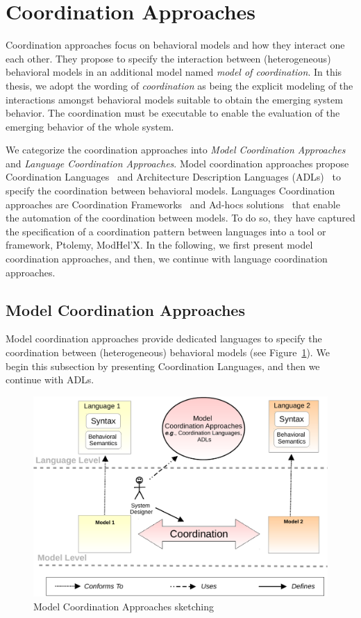 \section{Coordination Approaches}
Coordination approaches focus on behavioral models and how they interact one each other. They propose to specify the interaction between (heterogeneous) behavioral models in an additional model named \emph{model of coordination}. In this thesis, we adopt the wording of \emph{coordination} as being the explicit modeling of the interactions amongst behavioral models suitable to obtain the emerging system behavior. The coordination must be executable to enable the evaluation of the emerging behavior of the whole system. 

We categorize the coordination approaches into \emph{Model Coordination Approaches} and \emph{Language Coordination Approaches}. Model coordination approaches propose Coordination Languages~\cite{coordsignibib} and Architecture Description Languages (ADLs)~\cite{frameadlsbib} to specify the coordination between behavioral models. Languages Coordination approaches are Coordination Frameworks~\cite{ptoleframebib,modhelxbib} and Ad-hocs solutions~\cite{mascotbib,dinatale} that enable the automation of the coordination between models. To do so, they have captured the specification of a coordination pattern between languages into a tool or framework, \eg Ptolemy, ModHel'X. In the following, we first present model coordination approaches, and then, we continue with language coordination approaches.
\subsection{Model Coordination Approaches}
Model coordination approaches provide dedicated languages to specify the coordination between (heterogeneous) behavioral models (see Figure~\ref{fig:modelcoord}). We begin this subsection by presenting Coordination Languages, and then we continue with ADLs. 

\begin{figure}
	\begin{center}
		\includegraphics[width=.7\textwidth]{background/figs/coordmodel}
		\caption{Model Coordination Approaches sketching}
		\label{fig:modelcoord}
	\end{center}
\end{figure}

